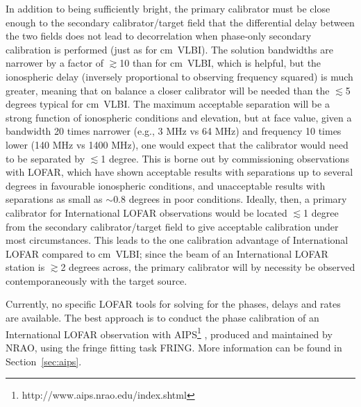 \documentclass[graybox]{svmult}
\begin{document}
In addition to being sufficiently bright, the primary calibrator must be close
enough to the secondary calibrator/target field that the differential delay
between the two fields does not lead to decorrelation when phase-only secondary
calibration is performed (just as for cm~VLBI).  The solution bandwidths are
narrower by a factor of $\gtrsim$10 than for cm~VLBI, which is helpful, but the
ionospheric delay (inversely proportional to observing frequency squared) is
much greater, meaning that on balance a closer calibrator will be needed than
the $\lesssim$5 degrees typical for cm~VLBI.  The maximum acceptable separation
will be a strong function of ionospheric conditions and elevation, but at face
value, given a bandwidth 20 times narrower (e.g., 3 MHz vs 64 MHz) and frequency
10 times lower (140 MHz vs 1400 MHz), one would expect that the calibrator would
need to be separated by $\lesssim$1 degree.  This is borne out by commissioning
observations with LOFAR, which have shown acceptable results with separations up
to several degrees in favourable ionospheric conditions, and unacceptable
results with separations as small as $\sim$0.8 degrees in poor conditions.
Ideally, then, a primary calibrator for International LOFAR observations would
be located $\lesssim$1 degree from the secondary calibrator/target field to give
acceptable calibration under most circumstances. This leads to the one
calibration advantage of International LOFAR compared to cm~VLBI; since the beam
of an International LOFAR station is $\gtrsim$2 degrees across, the primary
calibrator will by necessity be observed contemporaneously with the target
source.

Currently, no specific LOFAR tools for solving for the phases, delays and rates
are available. The best approach is to conduct the phase calibration of an
International LOFAR observation with
AIPS\footnote{http://www.aips.nrao.edu/index.shtml} \citep{greisen03a}, produced
and maintained by NRAO, using the fringe fitting task FRING. More information
can be found in Section~\ref{sec:aips}.
\end{document}
